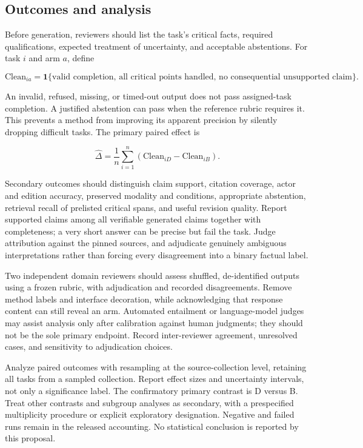\documentclass[
  11pt,
]{article}
\begin{document}
\subsection{Outcomes and analysis}\label{outcomes-and-analysis}

Before generation, reviewers should list the task's critical facts,
required qualifications, expected treatment of uncertainty, and
acceptable abstentions. For task \(i\) and arm \(a\), define

\[
\mathrm{Clean}_{ia} = \mathbf{1}\{\text{valid completion, all critical points handled, no consequential unsupported claim}\}.
\]

An invalid, refused, missing, or timed-out output does not pass
assigned-task completion. A justified abstention can pass when the
reference rubric requires it. This prevents a method from improving its
apparent precision by silently dropping difficult tasks. The primary
paired effect is

\[
\widehat{\Delta}=\frac{1}{n}\sum_{i=1}^{n}
\left(\mathrm{Clean}_{iD}-\mathrm{Clean}_{iB}\right).
\]

Secondary outcomes should distinguish claim support, citation coverage,
actor and edition accuracy, preserved modality and conditions,
appropriate abstention, retrieval recall of prelisted critical spans,
and useful revision quality. Report supported claims among all
verifiable generated claims together with completeness; a very short
answer can be precise but fail the task. Judge attribution against the
pinned sources, and adjudicate genuinely ambiguous interpretations
rather than forcing every disagreement into a binary factual label.

Two independent domain reviewers should assess shuffled, de-identified
outputs using a frozen rubric, with adjudication and recorded
disagreements. Remove method labels and interface decoration, while
acknowledging that response content can still reveal an arm. Automated
entailment or language-model judges may assist analysis only after
calibration against human judgments; they should not be the sole primary
endpoint. Record inter-reviewer agreement, unresolved cases, and
sensitivity to adjudication choices.

Analyze paired outcomes with resampling at the source-collection level,
retaining all tasks from a sampled collection. Report effect sizes and
uncertainty intervals, not only a significance label. The confirmatory
primary contrast is D versus B. Treat other contrasts and subgroup
analyses as secondary, with a prespecified multiplicity procedure or
explicit exploratory designation. Negative and failed runs remain in the
released accounting. No statistical conclusion is reported by this
proposal.
\end{document}
